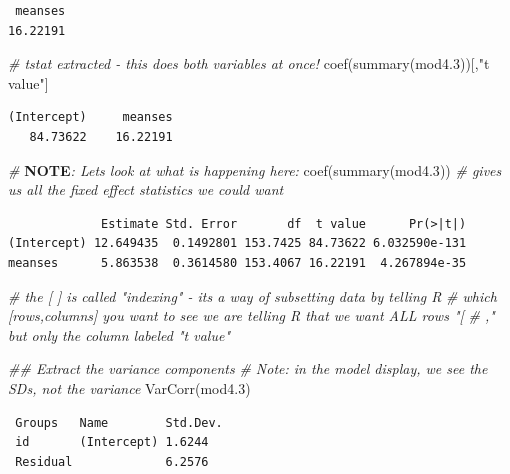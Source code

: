 \documentclass[
  letterpaper,
  DIV=11,
  numbers=noendperiod]{scrreprt}
\newenvironment{Shaded}{}{}
\newcommand{\AlertTok}[1]{\textcolor[rgb]{1.00,0.00,0.00}{\textbf{#1}}}
\newcommand{\CommentTok}[1]{\textcolor[rgb]{0.38,0.63,0.69}{\textit{#1}}}
\newcommand{\DocumentationTok}[1]{\textcolor[rgb]{0.73,0.13,0.13}{\textit{#1}}}
\newcommand{\FloatTok}[1]{\textcolor[rgb]{0.25,0.63,0.44}{#1}}
\newcommand{\FunctionTok}[1]{\textcolor[rgb]{0.02,0.16,0.49}{#1}}
\newcommand{\NormalTok}[1]{#1}
\newcommand{\StringTok}[1]{\textcolor[rgb]{0.25,0.44,0.63}{#1}}
\begin{document}
\begin{verbatim}
 meanses 
16.22191 
\end{verbatim}

\begin{Shaded}
\begin{Highlighting}[]
\CommentTok{\# tstat extracted {-} this does both variables at once! }
\FunctionTok{coef}\NormalTok{(}\FunctionTok{summary}\NormalTok{(mod4}\FloatTok{.3}\NormalTok{))[,}\StringTok{"t value"}\NormalTok{]}
\end{Highlighting}
\end{Shaded}

\begin{verbatim}
(Intercept)     meanses 
   84.73622    16.22191 
\end{verbatim}

\begin{Shaded}
\begin{Highlighting}[]
\CommentTok{\# }\AlertTok{NOTE}\CommentTok{: Let\textquotesingle{}s look at what is happening here:}
\FunctionTok{coef}\NormalTok{(}\FunctionTok{summary}\NormalTok{(mod4}\FloatTok{.3}\NormalTok{)) }\CommentTok{\# gives us all the fixed effect statistics we could want}
\end{Highlighting}
\end{Shaded}

\begin{verbatim}
             Estimate Std. Error       df  t value      Pr(>|t|)
(Intercept) 12.649435  0.1492801 153.7425 84.73622 6.032590e-131
meanses      5.863538  0.3614580 153.4067 16.22191  4.267894e-35
\end{verbatim}

\begin{Shaded}
\begin{Highlighting}[]
\CommentTok{\# the [ ] is called "indexing" {-} it\textquotesingle{}s a way of subsetting data by telling R}
\CommentTok{\# which [rows,columns] you want to see we are telling R that we want ALL rows "[}
\CommentTok{\# ," but only the column labeled "t value"}

\DocumentationTok{\#\# Extract the variance components}
\CommentTok{\# Note: in the model display, we see the SDs, not the variance}
\FunctionTok{VarCorr}\NormalTok{(mod4}\FloatTok{.3}\NormalTok{)}
\end{Highlighting}
\end{Shaded}

\begin{verbatim}
 Groups   Name        Std.Dev.
 id       (Intercept) 1.6244  
 Residual             6.2576  
\end{verbatim}
\end{document}
